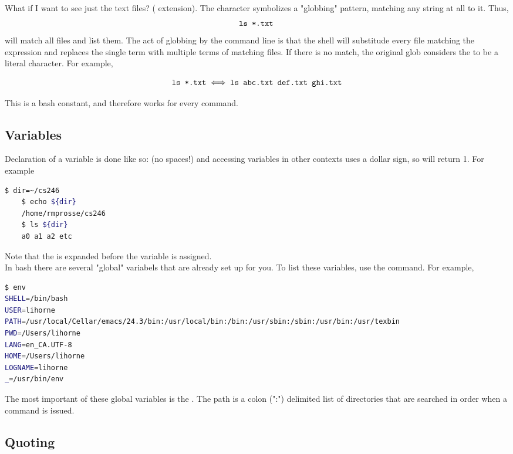 \documentclass[english, 11pt]{article}
\begin{document}
  What if I want to see just the text files? ( extension). The \tc{*} character symbolizes a "globbing" pattern, matching any string at all to it. Thus,
  \[ \mbox { \texttt{ls *.txt }} \]
  will match all  files and list them. The act of globbing by the command line is that the shell will substitude every file matching the expression and replaces the single term with multiple terms of matching files. If there is no match, the original glob considers the \tc{*} to be a literal character. For example,

  \[ \mbox{\texttt{ls *.txt}} \iff \mbox{\texttt{ls abc.txt def.txt ghi.txt}} \]

  This is a bash constant, and therefore works for every command.

  \subsection{Variables}

  Declaration of a variable is done like so:  (no spaces!) and accessing variables in other contexts uses a dollar sign, so  will return 1. For example
  \begin{lstlisting}[language=bash,numbers=none]
    $ dir=~/cs246
    $ echo ${dir}
    /home/rmprosse/cs246
    $ ls ${dir}
    a0 a1 a2 etc
  \end{lstlisting}

  Note that the \tc{$\sim$} is expanded before the variable is assigned. \\

  In bash there are several "global" variabels that are already set up for you. To list these variables, use the  command. For example,
  \begin{lstlisting}[language=bash,numbers=none]
$ env
SHELL=/bin/bash
USER=lihorne
PATH=/usr/local/Cellar/emacs/24.3/bin:/usr/local/bin:/bin:/usr/sbin:/sbin:/usr/bin:/usr/texbin
PWD=/Users/lihorne
LANG=en_CA.UTF-8
HOME=/Users/lihorne
LOGNAME=lihorne
_=/usr/bin/env
  \end{lstlisting}

  The most important of these global variables is the . The path is a colon (":") delimited list of directories that are searched in order when a command is issued.

  \subsection{Quoting}
\end{document}
